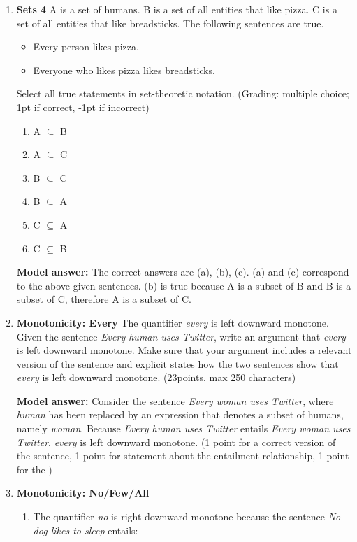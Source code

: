 \documentclass[a4,11pt]{article}
\begin{document}
\begin{enumerate}[leftmargin = 12pt]
\item {\bf Sets 4}  A is a set of humans. B is a set of all entities that like pizza. C is a set of all entities that like breadsticks.  The following sentences are true. 

\begin{itemize}[noitemsep]
\item Every person likes pizza.
\item Everyone who likes pizza likes breadsticks.
\end{itemize}

Select all true statements in set-theoretic notation. (Grading: multiple choice; 1pt if correct, -1pt if incorrect)

\begin{enumerate}
\item A $\subseteq$ B
\item A $\subseteq$ C
\item B $\subseteq$ C
\item B $\subseteq$ A
\item C $\subseteq$ A
\item C $\subseteq$ B
\end{enumerate}

{\bf Model answer:} The correct answers are (a), (b), (c). (a) and (c) correspond to the above given sentences. (b) is true because A is a subset of B and B is a subset of C, therefore A is a subset of C.

\item {\bf Monotonicity: Every} The quantifier \textit{every} is left downward monotone. Given the sentence \textit{Every human uses Twitter}, write an argument that \textit{every} is left downward monotone. Make sure that your argument includes a relevant version of the sentence and explicit states how the two sentences show that \textit{every} is left downward monotone. (23points, max 250 characters)
	
{\bf Model answer:} Consider the sentence \textit{Every woman uses Twitter}, where \textit{human} has been replaced by an expression that denotes a subset of humans, namely \textit{woman}. Because \textit{Every human uses Twitter} entails \textit{Every woman uses Twitter}, \textit{every} is left downward monotone. (1 point for a correct version of the sentence, 1 point for statement about the entailment relationship, 1 point for the  )

\item {\bf Monotonicity: No/Few/All} 

\begin{enumerate}
\item The quantifier \textit{no} is right downward monotone because the sentence \textit{No dog likes to sleep} entails:


\end{enumerate}
\end{enumerate}
\end{document}
